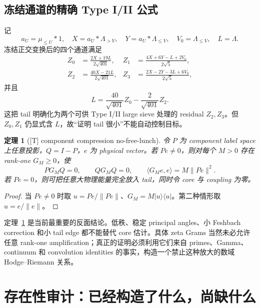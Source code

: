 \documentclass[UTF8,11pt,a4paper]{ctexart}
\newtheorem{theorem}{定理}[section]
\theoremstyle{definition}
\theoremstyle{remark}
\newcommand{\1}{\mathbf 1}
\newcommand{\statusT}{\textnormal{[T]}}
\begin{document}
\subsection{冻结通道的精确 Type I/II 公式}

记
\[
 a_U=\mu_{\leq U}*1,\quad X=a_U*\Lambda_{>V},\quad
 Y=a_U*\Lambda_{\leq V},\quad V_0=\Lambda_{\leq V},\quad L=\Lambda.
\]
冻结正交变换后的四个通道满足
\begin{align*}
 Z_0&=\frac{2X+19L}{2\sqrt{401}},&
 Z_1&=\frac{4X+6Y-L+2V_0}{2\sqrt5},\\
 Z_2&=\frac{40X-21L}{2\sqrt{401}},&
 Z_3&=\frac{2X-2Y-3L+6V_0}{2\sqrt5},
\end{align*}
并且
\[
  L=\frac{40}{\sqrt{401}}Z_0-\frac2{\sqrt{401}}Z_2.
\]
这把 tail 明确化为两个可供 Type I/II large sieve 处理的 residual $Z_2,Z_3$。但 $Z_0,Z_1$ 仍显式含 $L$，故“证明 tail 很小”不能自动控制目标。

\begin{theorem}[\statusT{} component compression no-free-lunch]\label{thm:nofree}
令 $P$ 为 component label space 上任意投影，$Q=I-P$，$e$ 为 physical vector。若 $Pe\neq0$，则对每个 $M>0$ 存在 rank-one $G_M\geq0$，使
\[
  PG_MQ=0,\qquad QG_MQ=0,\qquad
  \langle G_Me,e\rangle=M\|Pe\|^2.
\]
若 $Pe=0$，则可把任意大物理能量完全放入 tail，同时令 core 与 coupling 为零。
\end{theorem}

\begin{proof}
当 $Pe\neq0$ 时取 $u=Pe/\|Pe\|$、$G_M=M|u\rangle\langle u|$。第二种情形取 $u=e/\|e\|$。
\end{proof}

定理~\ref{thm:nofree} 是当前最重要的反面结论。低秩、稳定 principal angles、小 Feshbach correction 和小 tail edge 都不能替代 core 估计。具体 zeta Grams 当然未必允许任意 rank-one amplification；真正的证明必须利用它们来自 primes、Gamma、continuum 和 convolution identities 的事实，构造一个禁止这种放大的数域 Hodge--Riemann 关系。










\section{存在性审计：已经构造了什么，尚缺什么}
\end{document}
